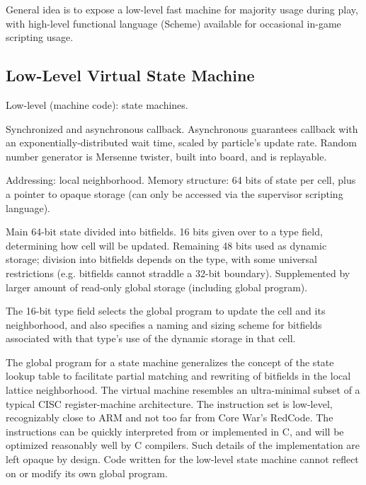 \documentclass{acm_proc_article-sp}
\begin{document}
General idea is to expose a low-level fast machine for majority usage during play,
with high-level functional language (Scheme) available for occasional in-game scripting usage.

\subsection{Low-Level Virtual State Machine}

Low-level (machine code):
state machines.

Synchronized and asynchronous callback.
Asynchronous guarantees callback with an exponentially-distributed wait time, scaled by particle's update rate.
Random number generator is Mersenne twister, built into board, and is replayable.

Addressing: local neighborhood.
Memory structure: 64 bits of state per cell, plus a pointer to opaque storage (can only be accessed via the supervisor scripting language).

Main 64-bit state divided into bitfields. 16 bits given over to a type field, determining how cell will be updated.
Remaining 48 bits used as dynamic storage; division into bitfields depends on the type, with some universal restrictions (e.g. bitfields cannot straddle a 32-bit boundary).
Supplemented by larger amount of read-only global storage (including global program).

The 16-bit type field selects the global program to update the cell and its neighborhood,
and also specifies a naming and sizing scheme for bitfields associated with that type's use of the dynamic storage in that cell.

The global program for a state machine generalizes the concept of the state lookup table to facilitate partial matching and rewriting of bitfields in the local lattice neighborhood.
The virtual machine resembles an ultra-minimal subset of a typical CISC register-machine architecture.
The instruction set is low-level, recognizably close to ARM\cite{seal00} and not too far from Core War's RedCode\cite{CoreWarGuidelines84}.
The instructions can be quickly interpreted from or implemented in C, and will be optimized reasonably well by C compilers.
Such details of the implementation are left opaque by design.
Code written for the low-level state machine cannot reflect on or modify its own global program.
\end{document}

